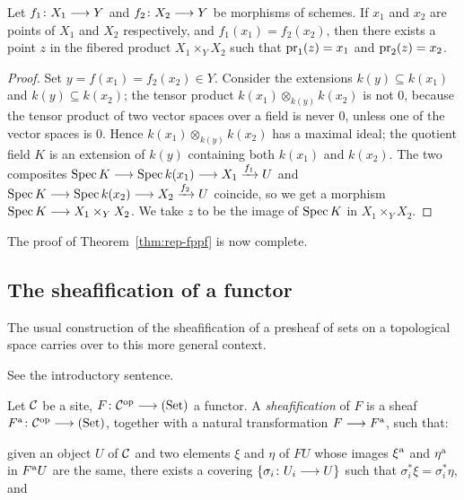 \begin{2   CONTRAVARIANT FUNCTORS}
\begin{2.3 Sheaves in Grothendieck topologies}
\begin{lemma}\label{lem:product-set}
Let $f_1 \colon X_1 \arr Y$ and $f_2 \colon X_2 \arr Y$ be morphisms of schemes. If $x_1$ and $x_2$ are points  of $X_1$ and $X_2$ respectively, and $f_1(x_1) = f_2(x_2)$, then there exists a point $z$ in the fibered product $X_1 \times_{Y} X_2$ such that $\operatorname{pr}_1(z) = x_1$ and $\operatorname{pr}_2(z) = x_2$.
\end{lemma}

\begin{proof}

Set $y = f(x_1) = f_2(x_2) \in Y$. Consider the extensions $k(y) \subseteq k(x_1)$ and $k(y) \subseteq k(x_2)$; the tensor product $k(x_1) \otimes_{k(y)} k(x_2)$ is not 0, because the tensor product of two vector spaces over a field is never $0$, unless one of the vector spaces is $0$. Hence $k(x_1) \otimes_{k(y)} k(x_2)$ has a maximal ideal; the quotient field $K$ is an extension of $k(y)$ containing both $k(x_1)$ and $k(x_2)$. The two composites $\spec K \arr \spec k(x_1) \arr X_1 \xrightarrow{f_1} U$ and $\spec K \arr \spec k(x_2)\arr X_2 \xrightarrow{f_2} U$ coincide, so we get a morphism $\spec K \arr X_{1} \times_Y X_{2}$. We take $z$ to be the image of $\operatorname{Spec} K$ in $X_1 \times_{Y} X_2$.
\end{proof}

The proof of Theorem~\ref{thm:rep-fppf} is now complete.



\subsection{The sheafification of a functor}

The usual construction of the sheafification of a presheaf of sets on a topological space carries over to this more general context.

\begin{shaded}
See the introductory sentence.
\end{shaded}


\begin{definition}\label{def:sheafification}
Let $\mathcal{C}$ be a site, $F \colon \cC\op \arr \catset$ a functor. A \emph{sheafification}%
 of $F$ is a sheaf $F\ass \colon \cC\op \arr \catset$, together with a natural transformation $F \arr F\ass$, such that:

\begin{enumeratei}

\item given an object $U$ of $\mathcal{C}$ and two elements $\xi$ and $\eta$ of $FU$ whose images $\xi^\mathrm{a}$ and $\eta^\mathrm{a}$ in  $F^\mathrm{a} U$ are the same, there exists a covering $\{\sigma_i\colon U_i \arr U\}$ such that $\sigma_i^* \xi = \sigma_i^* \eta$, and


\end{enumeratei}
\end{definition}
\end{2.3 Sheaves in Grothendieck topologies}
\end{2   CONTRAVARIANT FUNCTORS}
